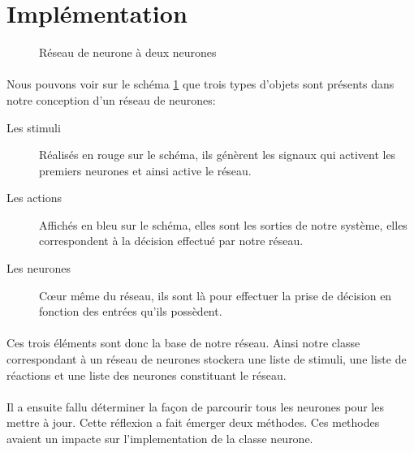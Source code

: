 \section{Implémentation}

\begin{figure}[ht]
  \centering
  
  \caption{Réseau de neurone à deux neurones}
  \label{graphInit}
\end{figure}

\paragraph{}
Nous pouvons voir sur le schéma \ref{graphInit} que trois types d'objets sont
présents dans notre conception d'un réseau de neurones:\\
\begin{description}
  \item[Les stimuli] Réalisés en rouge sur le schéma, ils génèrent les signaux
    qui activent les premiers neurones et ainsi active le réseau.
  \item[Les actions] Affichés en bleu sur le schéma, elles sont les sorties de
    notre système, elles correspondent à la décision effectué par notre réseau.
  \item[Les neurones] Cœur même du réseau, ils sont là pour effectuer la prise
    de décision en fonction des entrées qu'ils possèdent.
\end{description}

\paragraph{}
Ces trois éléments sont donc la base de notre réseau. Ainsi notre classe correspondant
à un réseau de neurones stockera une liste de stimuli, une liste de réactions et une
liste des neurones constituant le réseau.

\paragraph{}
Il a ensuite fallu déterminer la façon de parcourir tous les neurones pour les
mettre à jour. Cette réflexion a fait émerger deux méthodes. Ces methodes
avaient un impacte sur l'implementation de la classe neurone. \\

